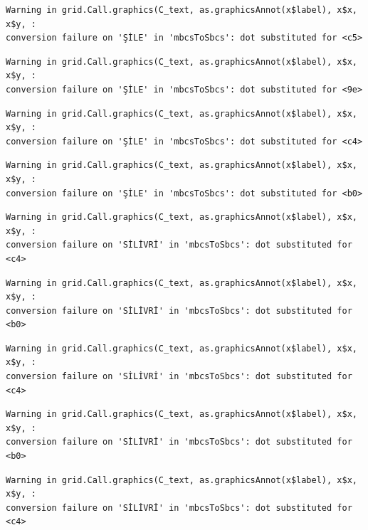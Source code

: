 \documentclass[
  11pt,
  a4paper,
  DIV=11,
  numbers=noendperiod]{scrartcl}
\begin{document}
\begin{verbatim}
Warning in grid.Call.graphics(C_text, as.graphicsAnnot(x$label), x$x, x$y, :
conversion failure on 'ŞİLE' in 'mbcsToSbcs': dot substituted for <c5>
\end{verbatim}

\begin{verbatim}
Warning in grid.Call.graphics(C_text, as.graphicsAnnot(x$label), x$x, x$y, :
conversion failure on 'ŞİLE' in 'mbcsToSbcs': dot substituted for <9e>
\end{verbatim}

\begin{verbatim}
Warning in grid.Call.graphics(C_text, as.graphicsAnnot(x$label), x$x, x$y, :
conversion failure on 'ŞİLE' in 'mbcsToSbcs': dot substituted for <c4>
\end{verbatim}

\begin{verbatim}
Warning in grid.Call.graphics(C_text, as.graphicsAnnot(x$label), x$x, x$y, :
conversion failure on 'ŞİLE' in 'mbcsToSbcs': dot substituted for <b0>
\end{verbatim}

\begin{verbatim}
Warning in grid.Call.graphics(C_text, as.graphicsAnnot(x$label), x$x, x$y, :
conversion failure on 'SİLİVRİ' in 'mbcsToSbcs': dot substituted for <c4>
\end{verbatim}

\begin{verbatim}
Warning in grid.Call.graphics(C_text, as.graphicsAnnot(x$label), x$x, x$y, :
conversion failure on 'SİLİVRİ' in 'mbcsToSbcs': dot substituted for <b0>
\end{verbatim}

\begin{verbatim}
Warning in grid.Call.graphics(C_text, as.graphicsAnnot(x$label), x$x, x$y, :
conversion failure on 'SİLİVRİ' in 'mbcsToSbcs': dot substituted for <c4>
\end{verbatim}

\begin{verbatim}
Warning in grid.Call.graphics(C_text, as.graphicsAnnot(x$label), x$x, x$y, :
conversion failure on 'SİLİVRİ' in 'mbcsToSbcs': dot substituted for <b0>
\end{verbatim}

\begin{verbatim}
Warning in grid.Call.graphics(C_text, as.graphicsAnnot(x$label), x$x, x$y, :
conversion failure on 'SİLİVRİ' in 'mbcsToSbcs': dot substituted for <c4>
\end{verbatim}
\end{document}
